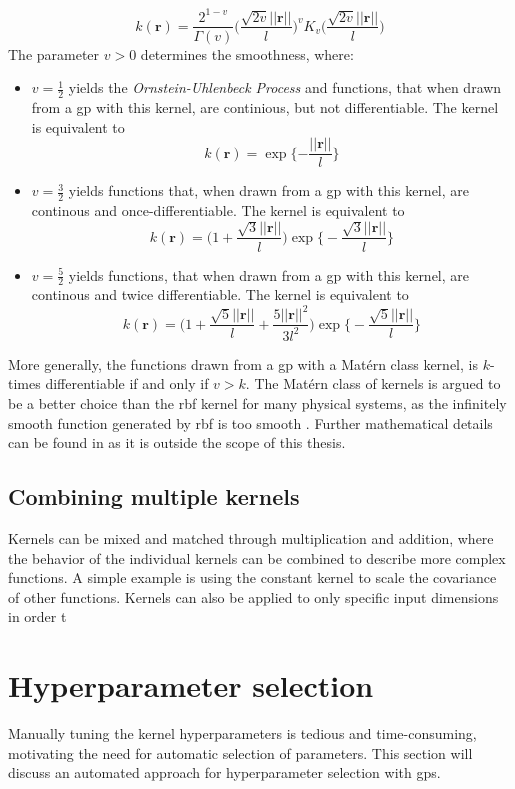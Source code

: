 \begin{equation}\label{eq:kernel_matern}
    k(\boldsymbol{r}) = \frac{2^{1-v}}{\Gamma(v)}\bigg(\frac{\sqrt{2 v} ||\boldsymbol{r}||}{l} \bigg)^v K_v \bigg(\frac{\sqrt{2v} || \boldsymbol{r}||}{l} \bigg)
\end{equation}
The parameter $v > 0$ determines the smoothness, where:
\begin{itemize}
    \item $v=\frac{1}{2}$ yields the \textit{Ornstein-Uhlenbeck Process} and functions, that when drawn from a \acrshort{gp} with this kernel, are continious, but not differentiable. The kernel is equivalent to $$k(\boldsymbol{r}) = \exp \{-\frac{||\boldsymbol{r}||}{l}\}$$
    \item $v=\frac{3}{2}$ yields functions that, when drawn from a \acrshort{gp} with this kernel, are continous and once-differentiable. The kernel is equivalent to $$k(\boldsymbol{r}) = \big(1 + \frac{\sqrt{3} ||\boldsymbol{r}||}{l}\big) \exp\big\{- \frac{\sqrt{3} ||\boldsymbol{r}||}{l}\big\}$$
    \item $v=\frac{5}{2}$ yields functions, that when drawn from a \acrshort{gp} with this kernel,  are continous and twice differentiable. The kernel is equivalent to $$k(\boldsymbol{r}) = \big(1 + \frac{\sqrt{5} ||\boldsymbol{r}||}{l} + \frac{5 ||\boldsymbol{r}||^2}{3 l^2}\big) \exp\big\{- \frac{\sqrt{5} ||\boldsymbol{r}||}{l}\big\}$$
\end{itemize}
More generally, the functions drawn from a \acrshort{gp} with a Matérn class kernel, is $k$-times differentiable if and only if $v > k$\cite{rasmussen}. The Matérn class of kernels is argued to be a better choice than the \acrshort{rbf} kernel for many physical systems, as the infinitely smooth function generated by \acrshort{rbf} is too smooth \cite{rasmussen}.
Further mathematical details can be found in \cite[sec.~4.2]{rasmussen} as it is outside the scope of this thesis.


\subsection{Combining multiple kernels}
Kernels can be mixed and matched through multiplication and addition, where the behavior of the individual kernels can be combined to describe more complex functions. A simple example is using the constant kernel to scale the covariance of other functions. Kernels can also be applied to only specific input dimensions in order t
\section{Hyperparameter selection}
Manually tuning the kernel hyperparameters is tedious and time-consuming, motivating the need for automatic selection of parameters. This section will discuss an automated approach for hyperparameter selection with \acrshort{gp}s.

